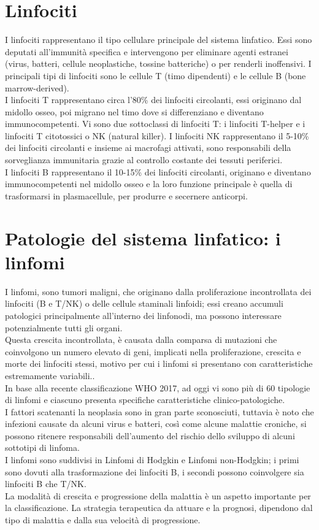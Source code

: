\section{Linfociti}
I linfociti rappresentano il tipo cellulare principale del sistema linfatico. 
Essi sono deputati all'immunità specifica e intervengono per eliminare agenti estranei 
(virus, batteri, cellule neoplastiche, tossine batteriche) o per renderli inoffensivi. 
I principali tipi di linfociti sono le cellule T (timo dipendenti) e le cellule B (bone marrow-derived)\cite{BOOK2}.\\
I linfociti T rappresentano circa l’80\% dei linfociti circolanti, essi originano dal midollo osseo, 
poi migrano nel timo dove si differenziano e diventano immunocompetenti. 
Vi sono due sottoclassi di linfociti T: i linfociti T-helper e i linfociti T citotossici o NK (natural killer). 
I linfociti NK rappresentano il 5-10\% dei linfociti circolanti e insieme ai macrofagi attivati, 
sono responsabili della sorveglianza immunitaria grazie al controllo costante dei tessuti periferici.\\
I linfociti B rappresentano il 10-15\% dei linfociti circolanti, originano e diventano immunocompetenti 
nel midollo osseo e la loro funzione principale è quella di trasformarsi in plasmacellule, 
per produrre e secernere anticorpi\cite{BOOK2}.

\section{Patologie del sistema linfatico: i linfomi}
I linfomi, sono tumori maligni, che originano dalla proliferazione incontrollata dei linfociti (B e T/NK)
o delle cellule staminali linfoidi; essi creano accumuli patologici principalmente
all'interno dei linfonodi, ma possono interessare potenzialmente tutti gli organi.\\ 
Questa crescita incontrollata, è causata dalla comparsa di mutazioni che coinvolgono un numero elevato di geni, 
implicati nella proliferazione, crescita e morte dei linfociti stessi, motivo 
per cui i linfomi si presentano con caratteristiche estremamente variabili.\cite{LINFOMIAIL}.\\ 
In base alla recente classificazione WHO 2017, ad oggi vi sono più di 60 tipologie di linfomi 
e ciascuno presenta specifiche caratteristiche clinico-patologiche\cite{AIOM}.\\
I fattori scatenanti la neoplasia sono in gran parte sconosciuti, tuttavia è noto che infezioni causate da alcuni virus e 
batteri, così come alcune malattie croniche, si possono ritenere responsabili dell’aumento del rischio dello 
sviluppo di alcuni sottotipi di linfoma\cite{LINFOMIAIL}.\\
I linfomi sono suddivisi in Linfomi di Hodgkin e Linfomi non-Hodgkin; 
i primi sono dovuti alla trasformazione dei linfociti B, i secondi possono coinvolgere sia linfociti B che T/NK.\\ 
La modalità di crescita e progressione della malattia è un aspetto importante per la classificazione.
La strategia terapeutica da attuare e la prognosi, dipendono dal tipo di malattia e dalla sua velocità di 
progressione\cite{LINFOMIAIL}.

